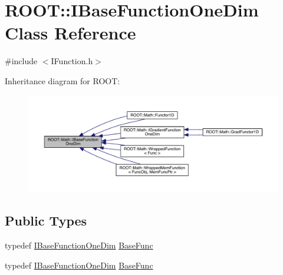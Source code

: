 \hypertarget{classROOT_1_1Math_1_1IBaseFunctionOneDim}{}\section{R\+O\+OT\+:\+:I\+Base\+Function\+One\+Dim Class Reference}
\label{classROOT_1_1Math_1_1IBaseFunctionOneDim}


{\ttfamily \#include $<$I\+Function.\+h$>$}



Inheritance diagram for R\+O\+OT\+:\nopagebreak
\begin{figure}[H]
\begin{center}
\leavevmode
\includegraphics[width=350pt]{d9/de3/classROOT_1_1Math_1_1IBaseFunctionOneDim__inherit__graph}
\end{center}
\end{figure}
\subsection*{Public Types}
\begin{DoxyCompactItemize}
\item 
typedef \mbox{\hyperlink{classROOT_1_1Math_1_1IBaseFunctionOneDim}{I\+Base\+Function\+One\+Dim}} \mbox{\hyperlink{classROOT_1_1Math_1_1IBaseFunctionOneDim_a87fee465cea6b03c55aa6bc1cf641cc9}{Base\+Func}}
\item 
typedef \mbox{\hyperlink{classROOT_1_1Math_1_1IBaseFunctionOneDim}{I\+Base\+Function\+One\+Dim}} \mbox{\hyperlink{classROOT_1_1Math_1_1IBaseFunctionOneDim_a87fee465cea6b03c55aa6bc1cf641cc9}{Base\+Func}}
\end{DoxyCompactItemize}
